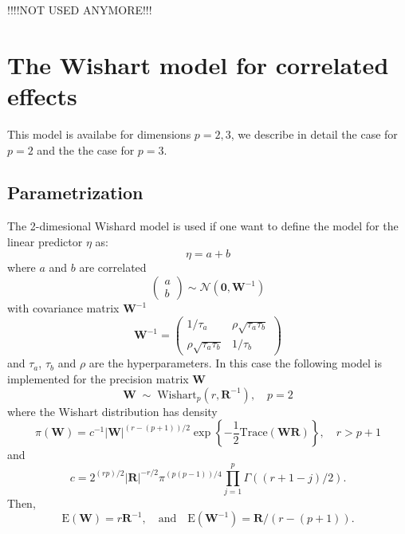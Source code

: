 \documentclass[a4paper,11pt]{article}
\begin{document}
!!!!NOT USED ANYMORE!!!


\section*{The Wishart model for correlated effects}

This model is availabe for dimensions $p=2,3$, we describe in detail
the case for $p=2$ and the the case for $p=3$.

\subsection*{Parametrization}

The 2-dimesional Wishard model is used if one want to define the model
for the linear predictor $\eta$ as:
\[
\eta=a+b
\]
where $a$ and $b$ are correlated
\[
\left(
  \begin{array}{c}
      a\\
      b
  \end{array}\right)
\sim \mathcal{N}\left(\mathbf{0}, \mathbf{W}^{-1}\right)
\]
with covariance matrix $\mathbf{W}^{-1}$
\begin{equation}
    \label{precision}
    \mathbf{W}^{-1} = \left(\begin{array}{cc}
          1/\tau_a & \rho \sqrt{\tau_a\tau_b}\\
          \rho\sqrt{\tau_a\tau_b}&  1/\tau_b
      \end{array}\right)
\end{equation}
and $\tau_{a}$, $\tau_{b}$ and $\rho$ are the hyperparameters. In this
case the following model is implemented for the precision matrix
$\mathbf{W}$
\begin{displaymath}
    \mathbf{W}
    \;\sim\;\text{Wishart}_{p}(r, \mathbf{R}^{-1}), \quad p=2
\end{displaymath}
where the Wishart distribution has density
\begin{displaymath}
    \pi(\mathbf{W}) = c^{-1} |\mathbf{W}|^{(r-(p+1))/2} \exp\left\{
      -\frac{1}{2}\text{Trace}(\mathbf{W}\mathbf{R})\right\}, \quad r > p+1
\end{displaymath}
and
\begin{displaymath}
    c = 2^{(rp)/2} |\mathbf{R}|^{-r/2} \pi^{(p(p-1))/4}\prod_{j=1}^{p} \Gamma((r+1-j)/2).
\end{displaymath}
Then,
\begin{displaymath}
    \text{E}(\mathbf{W}) = r\mathbf{R}^{-1}, \quad\text{and}\quad
    \text{E}(\mathbf{W}^{-1}) = \mathbf{R}/(r-(p+1)).
\end{displaymath}
\end{document}
